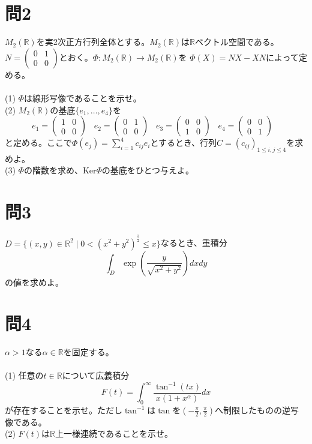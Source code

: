 ﻿\documentclass{jsarticle}
\begin{document}
\section*{問2}
\noindent
$M_{2}(\mathbb{R})$を実2次正方行列全体とする。$M_{2}(\mathbb{R})$は$\mathbb{R}$ベクトル空間である。\\
$N = \begin{pmatrix} 0 & 1 \\ 0& 0 \end{pmatrix}$とおく。$\Phi:M_{2}(\mathbb{R}) \rightarrow M_{2}(\mathbb{R})$を
$\Phi(X) = NX - XN$によって定める。\\　\\
(1) $\Phi$は線形写像であることを示せ。\\
(2) $M_{2}(\mathbb{R})$の基底$\{ e_1, \ldots ,e_4 \}$を
$$
e_1 = \begin{pmatrix} 1&0\\0&0 \end{pmatrix} \hspace{10pt}
e_2 = \begin{pmatrix} 0&1\\0&0 \end{pmatrix} \hspace{10pt}
e_3 = \begin{pmatrix} 0&0\\1&0 \end{pmatrix} \hspace{10pt}
e_4 = \begin{pmatrix} 0&0\\0&1 \end{pmatrix} \hspace{10pt}
$$
と定める。ここで$\Phi ( e_{j} ) = \sum_{i = 1}^{4} c_{ij}e_{i} $とするとき、行列$C = (c_{ij})_{1 \leq i,j \leq 4}$を求めよ。\\
(3) $\Phi$の階数を求め、Ker$\Phi$の基底をひとつ与えよ。\\

\section*{問3}
$D = \{ (x, y) \in \mathbb{R}^2 \mid 0 <(x^2 + y^2)^{ \frac{3}{2} } \leq x \} $なるとき、重積分
$$
\int_D \exp( \frac{y}{ \sqrt{x^2 + y^2} } ) dxdy
$$
の値を求めよ。\\

\section*{問4}
$\alpha > 1$なる$\alpha \in \mathbb{R}$を固定する。\\ \\
(1) 任意の$t \in \mathbb{R}$について広義積分
$$
F(t) = \int_0^{\infty} \frac{ \tan^{-1}(tx) }{x(1+x^{\alpha} )} dx
$$
が存在することを示せ。ただし$\tan^{-1}$は$\tan$を$(-\frac{\pi}{2}, \frac{\pi}{2})$へ制限したものの逆写像である。\\
(2) $F(t)$は$\mathbb{R}$上一様連続であることを示せ。\\
\end{document}
